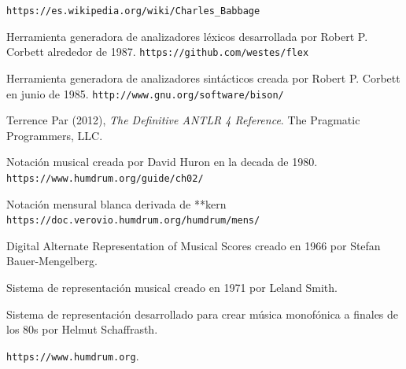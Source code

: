 \documentclass{article}
\begin{document}
    \newpage
    \begin{thebibliography}{9}
        \texttt{https://es.wikipedia.org/wiki/Charles\_Babbage}

        Herramienta generadora de analizadores léxicos desarrollada por Robert P. Corbett alrededor de 1987.
        \texttt{https://github.com/westes/flex}

        Herramienta generadora de analizadores sintácticos creada por Robert P. Corbett en junio de 1985.
        \texttt{http://www.gnu.org/software/bison/}


        Terrence Par (2012), \textit{The Definitive ANTLR 4 Reference}. The Pragmatic Programmers, LLC.

        Notación musical creada por David Huron en la decada de 1980.
        \texttt{https://www.humdrum.org/guide/ch02/}

        Notación mensural blanca derivada de **kern
        \texttt{https://doc.verovio.humdrum.org/humdrum/mens/}

        Digital Alternate Representation of Musical Scores creado en 1966 por Stefan Bauer-Mengelberg.

        Sistema de representación musical creado en 1971 por Leland Smith.

        Sistema de representación desarrollado para crear música monofónica a finales de los 80s por Helmut Schaffrasth.

        \texttt{https://www.humdrum.org}.




    \end{thebibliography}
\end{document}
